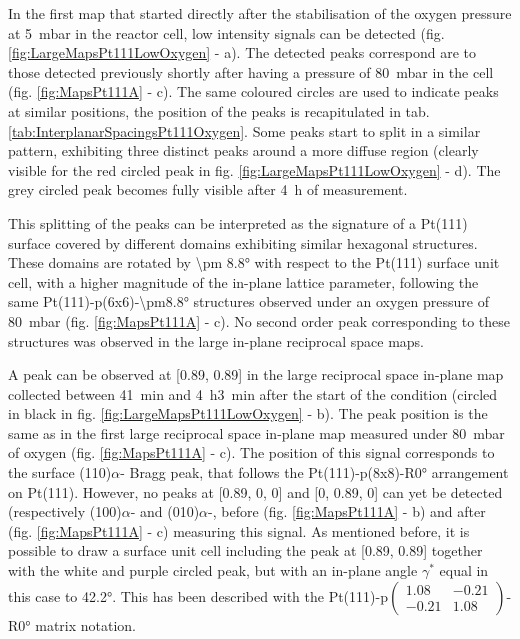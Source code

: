 In the first map that started directly after the stabilisation of the oxygen pressure at \qty{5}{\milli\bar} in the reactor cell, low intensity signals can be detected (fig. \ref{fig:LargeMapsPt111LowOxygen} - a).
The detected peaks correspond are to those detected previously shortly after having a pressure of \qty{80}{\milli\bar} in the cell (fig. \ref{fig:MapsPt111A} - c).
The same coloured circles are used to indicate peaks at similar positions, the position of the peaks is recapitulated in tab. \ref{tab:InterplanarSpacingsPt111Oxygen}.
Some peaks start to split in a similar pattern, exhibiting three distinct peaks around a more diffuse region (clearly visible for the red circled peak in fig. \ref{fig:LargeMapsPt111LowOxygen} - d).
The grey circled peak becomes fully visible after \qty{4}{\hour} of measurement.

This splitting of the peaks can be interpreted as the signature of a Pt(111) surface covered by different domains exhibiting similar hexagonal structures.
These domains are rotated by \ang{\pm 8.8} with respect to the Pt(111) surface unit cell, with a higher magnitude of the in-plane lattice parameter, following the same Pt(111)-p(6x6)-\ang{\pm8.8} structures observed under an oxygen pressure of \qty{80}{\milli\bar} (fig. \ref{fig:MapsPt111A} - c).
No second order peak corresponding to these structures was observed in the large in-plane reciprocal space maps.

A peak can be observed at [0.89, 0.89] in the large reciprocal space in-plane map collected between \qty{41}{\minute} and \qty{4}{\hour}\qty{3}{\minute} after the start of the condition (circled in black in fig. \ref{fig:LargeMapsPt111LowOxygen} - b).
The peak position is the same as in the first large reciprocal space in-plane map measured under \qty{80}{\milli\bar} of oxygen (fig. \ref{fig:MapsPt111A} - c).
The position of this signal corresponds to the surface (110)$\alpha$- Bragg peak, that follows the Pt(111)-p(8x8)-R\ang{0} arrangement on Pt(111).
However, no peaks at [0.89, 0, 0] and [0, 0.89, 0] can yet be detected (respectively (100)$\alpha$- and (010)$\alpha$-, before (fig. \ref{fig:MapsPt111A} - b) and after (fig. \ref{fig:MapsPt111A} - c) measuring this signal.
As mentioned before, it is possible to draw a surface unit cell including the peak at [0.89, 0.89] together with the white and purple circled peak, but with an in-plane angle $\gamma^*$ equal in this case to \ang{42.2}.
This has been described with the Pt(111)-p$\begin{pmatrix} 1.08 & -0.21 \\ -0.21 & 1.08 \end{pmatrix}$-R\ang{0} matrix notation.

